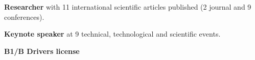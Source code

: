 

\begin{cventries}

  \cventry
    {} 
    {} 
    {} 
    {} 
    {
      \vspace{-.6cm}
      \begin{cvitems} %
        \item[] {\hspace{-.4cm} \textbf{Researcher} with 11 international scientific articles published (2 journal and 9 conferences).}
        \item[] {\hspace{-.4cm} \textbf{Keynote speaker} at 9 technical, technological and scientific events.}
        \item[] {\hspace{-.4cm} \textbf{B1/B Drivers license}}
      \end{cvitems}
    }
  \vspace{0.6cm} 

\end{cventries}
